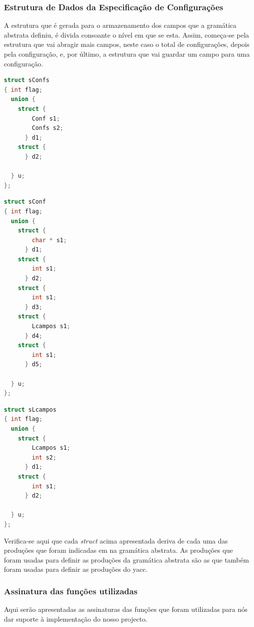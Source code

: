 \documentclass[11pt, a4paper, oneside]{article}
\begin{document}
\newpage
\subsubsection{Estrutura de Dados da Especificação de Configurações}
A estrutura que é gerada para o armazenamento dos campos que a gramática abstrata definiu, é divida consoante o nível em que se esta. Assim, começa-se pela estrutura que vai abragir mais campos, neste caso o total de configurações, depois pela configuração, e, por último, a estrutura que vai guardar um campo para uma configuração.

\begin{lstlisting}[language=C, caption={Estrutura de dados para armazenar as configurações.}]
struct sConfs 
{ int flag;
  union {  
    struct {
        Conf s1;
        Confs s2;
      } d1;
    struct {
      } d2;

  } u;
};
\end{lstlisting}

\begin{lstlisting}[language=C, caption={Estrutura de dados que armazena uma configuração.}]
struct sConf 
{ int flag;
  union {  
    struct {
        char * s1;
      } d1;
    struct {
        int s1;
      } d2;
    struct {
        int s1;
      } d3;
    struct {
        Lcampos s1;
      } d4;
    struct {
        int s1;
      } d5;

  } u;
};
\end{lstlisting}

\begin{lstlisting}[language=C, caption={Estrututura de dados que armazena os campos de um configuração.}]
struct sLcampos 
{ int flag;
  union {  
    struct {
        Lcampos s1;
        int s2;
      } d1;
    struct {
        int s1;
      } d2;

  } u;
};
\end{lstlisting}

Verifica-se aqui que cada \textit{struct} acima apresentada deriva de cada uma das produções que foram indicadas em na gramática abstrata.
As produções que foram usadas para definir as produções da gramática abstrata são as que também foram usadas para definir as produções do yacc.
\newpage

\subsubsection{Assinatura das funções utilizadas}
Aqui serão apresentadas as assinaturas das funções que foram utilizadas para nós dar suporte à implementação do nosso projecto.
\end{document}
